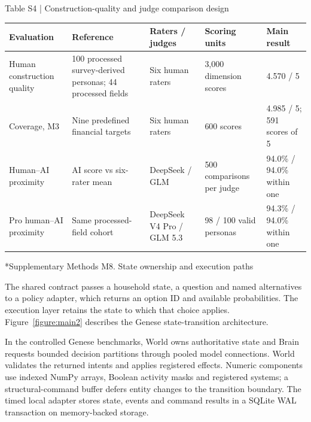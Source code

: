 \documentclass[10pt]{article}
\makeatletter
\renewcommand\section{\@startsection{section}{1}{\z@}{-2.2ex plus -1ex minus -.2ex}{.9ex plus .2ex}{\normalfont\large\mdseries}}
\makeatother
\begin{document}
\begin{center}
\begin{minipage}{\textwidth}
\fontsize{8.5}{10.3}\selectfont
Table S4 | Construction-quality and judge comparison design
\par\vspace{4pt}
\begin{tabularx}{\textwidth}{@{}XXXXX@{}}
\toprule
Evaluation & Reference & Raters / judges & Scoring units & Main result \\
\midrule
Human construction quality & 100 processed survey-derived personas; 44 processed fields & Six human raters & 3,000 dimension scores & 4.570 / 5 \\
Coverage, M3 & Nine predefined financial targets & Six human raters & 600 scores & 4.985 / 5; 591 scores of 5 \\
Human–AI proximity & AI score vs six-rater mean & DeepSeek / GLM & 500 comparisons per judge & 94.0\% / 94.0\% within one \\
Pro human–AI proximity & Same processed-field cohort & DeepSeek V4 Pro / GLM 5.3 & 98 / 100 valid personas & 94.3\% / 94.0\% within one \\
\bottomrule
\end{tabularx}
\par{}
\end{minipage}
\end{center}

\section*{Supplementary Methods M8. State ownership and execution paths}

The shared contract passes a household state, a question and named alternatives to a policy adapter, which returns an option ID and available probabilities. The execution layer retains the state to which that choice applies. Figure~\ref{figure:main2} describes the Genese state-transition architecture.

In the controlled Genese benchmarks, World owns authoritative state and Brain requests bounded decision partitions through pooled model connections. World validates the returned intents and applies registered effects. Numeric components use indexed NumPy arrays, Boolean activity masks and registered systems; a structural-command buffer defers entity changes to the transition boundary. The timed local adapter stores state, events and command results in a SQLite WAL transaction on memory-backed storage.
\end{document}
